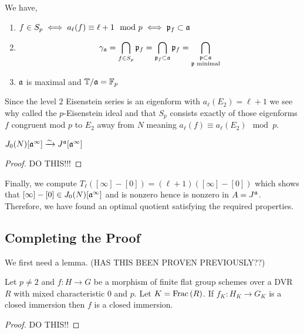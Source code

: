 \documentclass[12pt]{article}
\begin{document}
\begin{prop}
We have,
\begin{enumerate}
\item $f \in S_p \iff a_\ell(f) \equiv \ell + 1 \mod p \iff \mathfrak{p}_f \subset \mathfrak{a}$
\item \[ \gamma_{\mathfrak{a}} = \bigcap\limits_{f \in S_p} \mathfrak{p}_f = \bigcap\limits_{\mathfrak{p}_f \subset \mathfrak{a}} \mathfrak{p}_f = \bigcap\limits_{\substack{ \mathfrak{p} \subset \mathfrak{a} \\ \mathfrak{p} \text{ minimal}}} \]
\item $\mathfrak{a}$ is maximal and $\mathbb{T} / \mathfrak{a} = \mathbb{F}_p$
\end{enumerate}
\end{prop}

\begin{rmk}
Since the level $2$ Eisenstein series is an eigenform with $a_\ell(E_2) = \ell + 1$ we see why called the $p$-Eisenstein ideal and that $S_p$ consists exactly of those eigenforms $f$ congruent mod $p$ to $E_2$ away from $N$ meaning $a_\ell(f) \equiv a_\ell(E_2) \mod p$. 
\end{rmk}

\begin{lemma}
$J_0(N)[\mathfrak{a}^\infty] \xrightarrow{\sim} J^{\mathfrak{a}}[\mathfrak{a}^\infty]$
\end{lemma}

\begin{proof}
DO THIS!!!
\end{proof}


Finally, we compute $T_\ell ([\infty] - [0]) = (\ell + 1) ([\infty] - [0])$ which shows that $[\infty] - [0] \in J_0(N)[\mathfrak{a}^\infty]$ and is nonzero hence is nonzero in $A = J^{\mathfrak{a}}$. Therefore, we have found an optimal quotient satisfying the required properties. 

\subsection{Completing the Proof}

\newcommand{\tors}{\mathrm{tors}}
\newcommand{\fin}{\mathrm{fin}}

We first need a lemma. (HAS THIS BEEN PROVEN PREVIOUSLY??)

\begin{prop}
Let $p \neq 2$ and $f : H \to G$ be a morphism of finite flat group schemes over a DVR $R$ with mixed characteristic $0$ and $p$. Let $K = \mathrm{Frac}\left(R\right)$. If $f_K : H_K \to G_K$ is a closed immersion then $f$ is a closed immersion.
\end{prop}

\begin{proof}
DO THIS!!
\end{proof}
\end{document}
